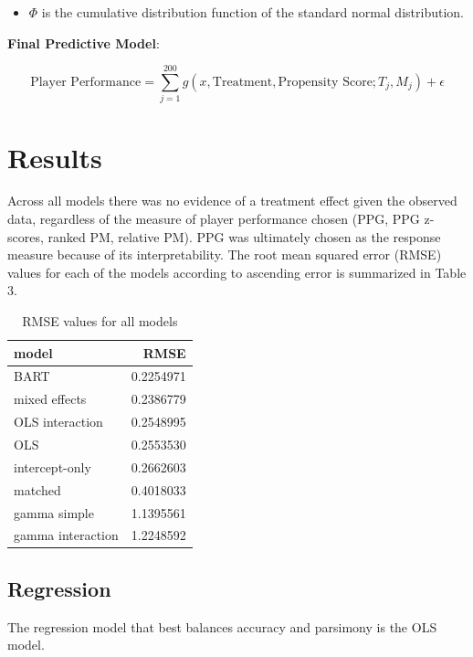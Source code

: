 \documentclass[12pt]{article}
\providecommand{\tightlist}{%
  \setlength{\itemsep}{0pt}\setlength{\parskip}{0pt}}
\begin{document}
\begin{itemize}
\tightlist
\item
  \(\Phi\) is the cumulative distribution function of the standard
  normal distribution.
\end{itemize}

\textbf{Final Predictive Model}:

\[ \text{Player Performance} = \sum_{j=1}^{200} g(x, \text{Treatment}, \text{Propensity Score};T_{j}, M_{j}) + \epsilon\]

\hypertarget{results}{%
\section{Results}\label{results}}

Across all models there was no evidence of a treatment effect given the
observed data, regardless of the measure of player performance chosen
(PPG, PPG z-scores, ranked PM, relative PM). PPG was ultimately chosen
as the response measure because of its interpretability. The root mean
squared error (RMSE) values for each of the models according to
ascending error is summarized in Table 3.

\begin{table}

\caption{\label{Table 3.}RMSE values for all models}
\centering
\begin{tabular}[t]{l|r}
\hline
model & RMSE\\
\hline
BART & 0.2254971\\
\hline
mixed effects & 0.2386779\\
\hline
OLS interaction & 0.2548995\\
\hline
OLS & 0.2553530\\
\hline
intercept-only & 0.2662603\\
\hline
matched & 0.4018033\\
\hline
gamma simple & 1.1395561\\
\hline
gamma interaction & 1.2248592\\
\hline
\end{tabular}
\end{table}

\hypertarget{regression-1}{%
\subsection{Regression}\label{regression-1}}

The regression model that best balances accuracy and parsimony is the
OLS model.
\end{document}
